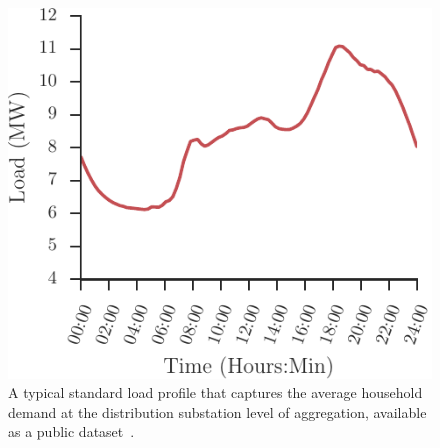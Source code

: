 \documentclass[conference]{IEEEtran}
\begin{document}

\begin{figure}[b]
\centering
\includegraphics{figures/slp.pdf}
\caption{A typical standard load profile that captures the average household demand at the distribution substation level of aggregation, available as a public dataset~\cite{SLPsource}.}
\label{fig:slp}
\end{figure}
\end{document}
